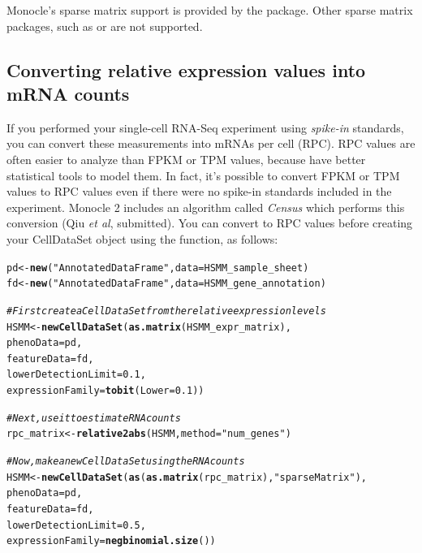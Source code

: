 \documentclass[10pt,oneside]{article}\usepackage[]{graphicx}\usepackage[]{color}
\makeatletter
\newcommand{\hlnum}[1]{\textcolor[rgb]{0.686,0.059,0.569}{#1}}%
\newcommand{\hlstr}[1]{\textcolor[rgb]{0.192,0.494,0.8}{#1}}%
\newcommand{\hlcom}[1]{\textcolor[rgb]{0.678,0.584,0.686}{\textit{#1}}}%
\newcommand{\hlstd}[1]{\textcolor[rgb]{0.345,0.345,0.345}{#1}}%
\newcommand{\hlkwb}[1]{\textcolor[rgb]{0.69,0.353,0.396}{#1}}%
\newcommand{\hlkwc}[1]{\textcolor[rgb]{0.333,0.667,0.333}{#1}}%
\newcommand{\hlkwd}[1]{\textcolor[rgb]{0.737,0.353,0.396}{\textbf{#1}}}%
\newenvironment{kframe}{%
 \def\at@end@of@kframe{}%
 \ifinner\ifhmode%
  \def\at@end@of@kframe{\end{minipage}}%
  \begin{minipage}{\columnwidth}%
 \fi\fi%
 \def\FrameCommand##1{\hskip\@totalleftmargin \hskip-\fboxsep
 \colorbox{shadecolor}{##1}\hskip-\fboxsep
     \hskip-\linewidth \hskip-\@totalleftmargin \hskip\columnwidth}%
 \MakeFramed {\advance\hsize-\width
   \@totalleftmargin\z@ \linewidth\hsize
   \@setminipage}}%
 {\par\unskip\endMakeFramed%
 \at@end@of@kframe}
\newenvironment{knitrout}{}{} %
\makeatother
\begin{document}
Monocle's sparse matrix support is provided by the  package. Other sparse matrix packages, such as  or  are not supported.
 
\subsection{Converting relative expression values into mRNA counts} \label{conv_rel2abs}
 
If you performed your single-cell RNA-Seq experiment using \emph{spike-in} standards, you can convert these measurements into mRNAs per cell (RPC). RPC values are often easier to analyze than FPKM or TPM values, because have better statistical tools to model them. In fact, it's possible to convert FPKM or TPM values to RPC values even if there were no spike-in standards included in the experiment. Monocle 2 includes an algorithm called \emph{Census} which performs this conversion (Qiu \emph{et al}, submitted). You can convert to RPC values before creating your CellDataSet object using the  function, as follows:
 
\begin{knitrout}
\color{fgcolor}\begin{kframe}
\begin{alltt}
\hlstd{pd} \hlkwb{<-} \hlkwd{new}\hlstd{(}\hlstr{"AnnotatedDataFrame"}\hlstd{,} \hlkwc{data} \hlstd{= HSMM_sample_sheet)}
\hlstd{fd} \hlkwb{<-} \hlkwd{new}\hlstd{(}\hlstr{"AnnotatedDataFrame"}\hlstd{,} \hlkwc{data} \hlstd{= HSMM_gene_annotation)}

\hlcom{# First create a CellDataSet from the relative expression levels}
\hlstd{HSMM} \hlkwb{<-} \hlkwd{newCellDataSet}\hlstd{(}\hlkwd{as.matrix}\hlstd{(HSMM_expr_matrix),}
                       \hlkwc{phenoData} \hlstd{= pd,}
                       \hlkwc{featureData} \hlstd{= fd,}
                       \hlkwc{lowerDetectionLimit}\hlstd{=}\hlnum{0.1}\hlstd{,}
                       \hlkwc{expressionFamily}\hlstd{=}\hlkwd{tobit}\hlstd{(}\hlkwc{Lower}\hlstd{=}\hlnum{0.1}\hlstd{))}

\hlcom{# Next, use it to estimate RNA counts}
\hlstd{rpc_matrix} \hlkwb{<-} \hlkwd{relative2abs}\hlstd{(HSMM,} \hlkwc{method} \hlstd{=} \hlstr{"num_genes"}\hlstd{)}

\hlcom{# Now, make a new CellDataSet using the RNA counts}
\hlstd{HSMM} \hlkwb{<-} \hlkwd{newCellDataSet}\hlstd{(}\hlkwd{as}\hlstd{(}\hlkwd{as.matrix}\hlstd{(rpc_matrix),} \hlstr{"sparseMatrix"}\hlstd{),}
                       \hlkwc{phenoData} \hlstd{= pd,}
                       \hlkwc{featureData} \hlstd{= fd,}
                       \hlkwc{lowerDetectionLimit}\hlstd{=}\hlnum{0.5}\hlstd{,}
                       \hlkwc{expressionFamily}\hlstd{=}\hlkwd{negbinomial.size}\hlstd{())}
\end{alltt}
\end{kframe}
\end{knitrout}
 
\end{document}

